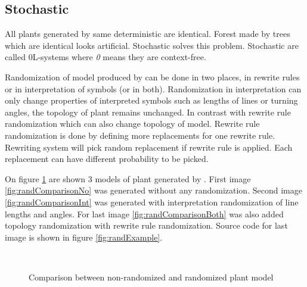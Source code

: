 \subsection{Stochastic \lsystems}

All plants generated by same deterministic \lsystem are identical.
Forest made by trees which are identical looks artificial.
Stochastic \lsystems solves this problem.
Stochastic \lsystems are called 0L-systems where \emph{0} means they are context-free.

Randomization of model produced by \lsystem can be done in two places, in rewrite rules or in interpretation of symbols (or in both).
Randomization in interpretation can only change properties of interpreted symbols such as lengths of lines or turning angles, the topology of plant remains unchanged.
In contrast with rewrite rule randomization which can also change topology of model.
Rewrite rule randomization is done by defining more replacements for one rewrite rule.
Rewriting system will pick random replacement if rewrite rule is applied.
Each replacement can have different probability to be picked.

On figure \ref{fig:randComparison} are shown 3 models of plant generated by \lsystems.
First image \ref{fig:randComparisonNo} was generated without any randomization.
Second image \ref{fig:randComparisonInt} was generated with interpretation randomization of line lengths and angles.
For last image \ref{fig:randComparisonBoth} was also added topology randomization with rewrite rule randomization.
Source code for last image is shown in figure \ref{fig:randExample}.

\begin{figure}[ht]
	\centering
	 ~
	 ~
	\caption{Comparison between non-randomized and randomized plant model}
	\label{fig:randComparison}
\end{figure}

